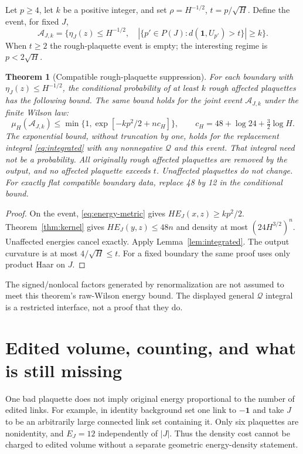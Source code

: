\documentclass[11pt]{article}
\newtheorem{theorem}{Theorem}[section]
\theoremstyle{definition}
\theoremstyle{remark}
\newcommand{\one}{\mathbf1}
\begin{document}
Let $p\ge4$, let $k$ be a positive integer, and set
$\rho=H^{-1/2}$, $t=p/\sqrt H$.
Define the event, for fixed $J$,
\[
 \mathcal A_{J,k}=
 \{\eta_J(z)\le H^{-1/2},\quad
   |\{p'\in P(J):d(\one,U_{p'})>t\}|\ge k\}.
\]
When $t\ge2$ the rough-plaquette event is empty; the interesting regime
is $p<2\sqrt H$.

\begin{theorem}[Compatible rough-plaquette suppression]\label{thm:bad}
For each boundary with $\eta_J(z)\le H^{-1/2}$, the conditional probability
of at least $k$ rough affected plaquettes has the following bound. The
same bound holds for the joint event $\mathcal A_{J,k}$ under the finite
Wilson law:
\begin{equation}
 \mu_H(\mathcal A_{J,k})
 \le\min\{1,\exp[-kp^2/2+n c_H]\},\qquad
 c_H=48+\log24+\tfrac32\log H.\label{eq:bad}
\end{equation}
The exponential bound, without truncation by one, holds for the
replacement integral \eqref{eq:integrated} with any nonnegative
$\mathcal Q$ and this event. That integral need not be a probability.
All originally rough affected plaquettes are removed by the output, and
no affected plaquette exceeds $t$. Unaffected plaquettes do not change.
For exactly flat compatible boundary data, replace 48 by 12 in the
conditional bound.
\end{theorem}
\begin{proof}
On the event, \eqref{eq:energy-metric} gives
$HE_J(x,z)\ge kp^2/2$. Theorem~\ref{thm:kernel} gives
$HE_J(y,z)\le48n$ and density at most $(24H^{3/2})^n$.
Unaffected energies cancel exactly. Apply Lemma~\ref{lem:integrated}.
The output curvature is at most $4/\sqrt H\le t$.
For a fixed boundary the same proof uses only product Haar on $J$.
\end{proof}
The signed/nonlocal factors generated by renormalization are not assumed
to meet this theorem's raw-Wilson energy bound. The displayed general
$\mathcal Q$ integral is a restricted interface, not a proof that they do.

\section{Edited volume, counting, and what is still missing}
One bad plaquette does not imply original energy proportional to the
number of edited links. For example, in identity background set one link
to $-\one$ and take $J$ to be an arbitrarily large connected link set
containing it. Only six plaquettes are nonidentity, and $E_J=12$
independently of $|J|$. Thus the density cost cannot be charged to
edited volume without a separate geometric energy-density statement.
\end{document}
